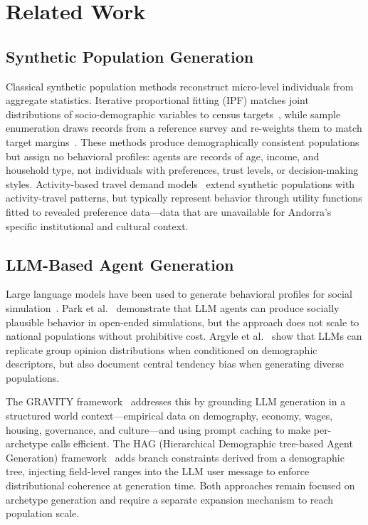 \documentclass[sustainability,article,submit,pdftex,moreauthors]{Definitions/mdpi}
\begin{document}
\section{Related Work}
\label{sec:related_work}

\subsection{Synthetic Population Generation}

Classical synthetic population methods reconstruct micro-level individuals
from aggregate statistics. Iterative proportional fitting (IPF) matches
joint distributions of socio-demographic variables to census
targets~\cite{deming1940least}, while sample enumeration draws records from a
reference survey and re-weights them to match target
margins~\cite{muller2021synthetic}. These methods produce demographically
consistent populations but assign no behavioral profiles: agents are records
of age, income, and household type, not individuals with preferences,
trust levels, or decision-making styles. Activity-based travel demand
models~\cite{axhausen2016population,bhat1999activity} extend synthetic
populations with activity-travel patterns, but typically represent behavior
through utility functions fitted to revealed preference data---data that are
unavailable for Andorra's specific institutional and cultural context.

\subsection{LLM-Based Agent Generation}

Large language models have been used to generate behavioral profiles for
social simulation~\cite{park2023generative,argyle2023outstuffing,
adornetto2025generative,garcia2025simulating}. Park et al.\ \cite{park2023generative}
demonstrate that LLM agents can produce socially plausible behavior in
open-ended simulations, but the approach does not scale to national populations
without prohibitive cost. Argyle et al.\ \cite{argyle2023outstuffing} show
that LLMs can replicate group opinion distributions when conditioned on
demographic descriptors, but also document central tendency bias when
generating diverse populations.

The GRAVITY framework~\cite{gravity2025} addresses this by grounding LLM
generation in a structured world context---empirical data on demography,
economy, wages, housing, governance, and culture---and using prompt caching
to make per-archetype calls efficient. The HAG (Hierarchical Demographic
tree-based Agent Generation) framework~\cite{li2025hugagent} adds branch
constraints derived from a demographic tree, injecting field-level ranges
into the LLM user message to enforce distributional coherence at generation
time. Both approaches remain focused on archetype generation and require a
separate expansion mechanism to reach population scale.
\end{document}
